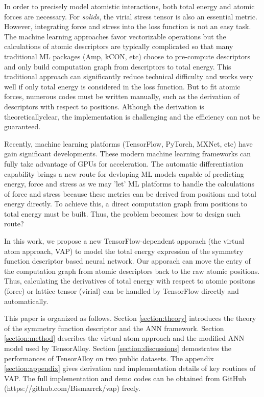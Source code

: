 \documentclass[preprint]{revtex4-2}
\begin{document}
In order to precisely model atomistic interactions, both total energy and atomic 
forces are necessary. For \textit{solids}, the virial stress tensor is also an
essential metric. However, integrating force and stress into the loss function 
is not an easy task. The machine learning approaches favor vectorizable 
operations but the calculations of atomic descriptors are typically complicated 
so that many traditional ML packages (Amp, kCON, etc) choose to pre-compute 
descriptors and only build computation graph from descriptors to total energy. 
This traditional approach can significantly reduce technical difficulty and 
works very well if only total energy is considered in the loss function. But to 
fit atomic forces, numerous codes must be written manually, such as the 
derivation of descriptors with respect to positions. Although the derivation is 
theoreticallyclear, the implementation is challenging and the efficiency can not 
be guaranteed.

Recently, machine learning platforms (TensorFlow\cite{tensorflow}, 
PyTorch\cite{pytorch}, MXNet\cite{MXNet}, etc) have gain significant 
developments. These modern machine learning frameworks can fully take advantage 
of GPUs for acceleration. The automatic differentiation capability brings a new 
route for devloping ML models capable of predicting energy, force and stress as 
we may 'let' ML platforms to handle the calculations of force and stress because 
these metrics can be derived from positions and total energy directly. To 
achieve this, a direct computation graph from positions to total energy must be
built. Thus, the problem becomes: how to design such route?

In this work, we propose a new TensorFlow-dependent apporach (the virtual atom 
approach, VAP) to model the total energy expression of the symmetry function 
descriptor based neural network. 
Our apporach can move the entry of the computation graph from atomic descriptors 
back to the raw atomic positions. Thus, calculating the derivatives of total 
energy with respect to atomic positons (force) or lattice tensor (virial) can be 
handled by TensorFlow directly and automatically. 

This paper is organized as follows. Section \ref{section:theory} introduces the 
theory of the symmetry function descriptor and the ANN framework. Section 
\ref{section:method} describes the virtual atom approach and the modified ANN 
model used by TensorAlloy. Section \ref{section:discussions} demostrates 
the performances of TensorAlloy on two public datasets. The appendix 
\ref{section:appendix} gives derivation and implementation details of key 
routines of VAP. The full implementation and demo codes can be obtained from 
GitHub (https://github.com/Bismarrck/vap) freely.
\end{document}
